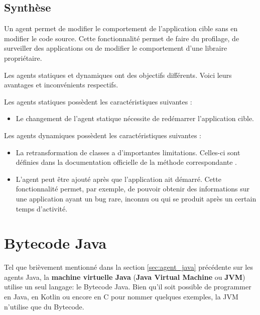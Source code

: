 \begin{minipage}{\linewidth}
\label{fig:cojac_dynamic_agent}
\end{minipage}

\subsection{Synthèse}

Un agent permet de modifier le comportement de l'application cible sans en modifier le code source. Cette fonctionnalité permet de faire du profilage, de surveiller des applications ou de modifier le comportement d'une libraire propriétaire.

Les agents statiques et dynamiques ont des objectifs différents. Voici leurs avantages et inconvénients respectifs.

Les agents statiques possèdent les caractéristiques suivantes :
\begin{itemize}
    \item Le changement de l'agent statique nécessite de redémarrer l'application cible.
\end{itemize}

Les agents dynamiques possèdent les caractéristiques suivantes :
\begin{itemize}
    \item La retransformation de classes a d'importantes limitations. Celles-ci sont définies dans la documentation officielle de la méthode correspondante \cite{java-instrumentation-retransform-documentation}.
    \item L'agent peut être ajouté après que l'application ait démarré. Cette fonctionnalité permet, par exemple, de pouvoir obtenir des informations sur une application ayant un bug rare, inconnu ou qui se produit après un certain temps d'activité.
\end{itemize}


\section{Bytecode Java}
\label{sec:bytecode}

Tel que brièvement mentionné dans la section \ref{sec:agent_java} précédente sur les agents Java, la \textbf{machine virtuelle Java} (\textbf{Java Virtual Machine} ou \textbf{JVM}) utilise un seul langage: le Bytecode Java. Bien qu'il soit possible de programmer en Java, en Kotlin ou encore en C pour nommer quelques exemples, la JVM n'utilise que du Bytecode.

